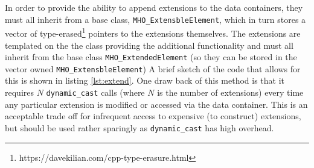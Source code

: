 In order to provide the ability to append extensions to the data containers, they must all inherit from a base class, \texttt{MHO\_ExtensbleElement}, which
in turn stores a vector of type-erased\footnote{https://davekilian.com/cpp-type-erasure.html} pointers to the extensions themselves. The extensions are templated on the the class providing the additional functionality and must all inherit from the base class \texttt{MHO\_ExtendedElement} (so they can be stored in the vector owned \texttt{MHO\_ExtensbleElement}) A brief sketch of the code that allows for this is shown in listing \ref{lst:extend}. One draw back of this method is that it requires $N$ \texttt{dynamic\_cast} calls (where $N$ is the number of extensions) every time any particular extension is modified or accessed via the data container. This is an acceptable trade off for infrequent access to expensive (to construct) extensions, but should be used rather sparingly as \texttt{dynamic\_cast} has high overhead.


